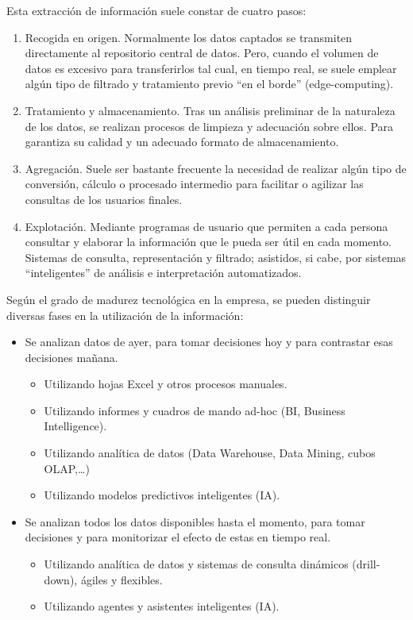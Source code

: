\documentclass[spanish,12pt,a4paper,final,oneside]{book}
\begin{document}
Esta extracción de información suele constar de cuatro pasos:
\begin{enumerate}
\item{Recogida en origen}. Normalmente los datos captados se transmiten directamente al repositorio central de datos. Pero, cuando el volumen de datos es excesivo para transferirlos tal cual, en tiempo real, se suele emplear algún tipo de filtrado y tratamiento previo ``en el borde'' (edge-computing).
\item{Tratamiento y almacenamiento}. Tras un análisis preliminar de la naturaleza de los datos, se realizan procesos de limpieza y adecuación sobre ellos. Para garantiza su calidad y un adecuado formato de almacenamiento.
\item{Agregación}. Suele ser bastante frecuente la necesidad de realizar algún tipo de conversión, cálculo o procesado intermedio para facilitar o agilizar las consultas de los usuarios finales.
\item{Explotación}. Mediante programas de usuario que permiten a cada persona consultar y elaborar la información que le pueda ser útil en cada momento. Sistemas de consulta, representación y filtrado; asistidos, si cabe, por sistemas ``inteligentes'' de análisis e interpretación automatizados.
\end{enumerate}

\newpage
Según el grado de madurez tecnológica en la empresa, se pueden distinguir diversas fases en la utilización de la información:
\begin{itemize}
\item Se analizan datos de ayer, para tomar decisiones hoy y para contrastar esas decisiones mañana.
\begin{itemize}
\item Utilizando hojas Excel y otros procesos manuales.
\item Utilizando informes y cuadros de mando ad-hoc (BI, Business Intelligence).
\item Utilizando analítica de datos (Data Warehouse, Data Mining, cubos OLAP,\ldots)
\item Utilizando modelos predictivos inteligentes (IA).
\end{itemize}
\item Se analizan todos los datos disponibles hasta el momento, para tomar decisiones y para monitorizar el efecto de estas en tiempo real.
\begin{itemize}
\item Utilizando analítica de datos y sistemas de consulta dinámicos (drill-down), ágiles y flexibles.
\item Utilizando agentes y asistentes inteligentes (IA).
\end{itemize}
\end{itemize}
\end{document}
